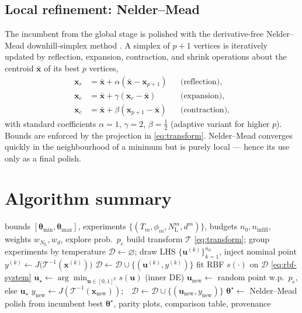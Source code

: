 \documentclass[11pt]{article}
\newcommand{\param}{\bm{\theta}}
\newcommand{\xv}{\bm{x}}
\newcommand{\NL}{N_{\mathrm{L}}}
\newcommand{\dpa}{\phi}
\begin{document}
\subsection{Local refinement: Nelder--Mead}
The incumbent from the global stage is polished with the derivative-free
Nelder--Mead downhill-simplex method \citep{NelderMead1965}. A simplex of $p+1$
vertices is iteratively updated by reflection, expansion, contraction, and shrink
operations about the centroid $\bar{\xv}$ of its best $p$ vertices,
\begin{align}
  \xv_{r} &= \bar{\xv}+\alpha(\bar{\xv}-\xv_{p+1}) &&\text{(reflection)},\\
  \xv_{e} &= \bar{\xv}+\gamma(\xv_{r}-\bar{\xv})   &&\text{(expansion)},\\
  \xv_{c} &= \bar{\xv}+\beta(\xv_{p+1}-\bar{\xv})  &&\text{(contraction)},
\end{align}
with standard coefficients $\alpha=1$, $\gamma=2$, $\beta=\tfrac12$ (adaptive
variant for higher $p$). Bounds are enforced by the projection in
\eqref{eq:transform}. Nelder--Mead converges quickly in the neighbourhood of a
minimum but is purely local --- hence its use only as a final polish.

\section{Algorithm summary}
\begin{algorithm}[ht]
\caption{Surrogate-based parameter identification (default path)}
\label{alg:sbo}
\begin{algorithmic}[1]
\Require bounds $[\param_{\min},\param_{\max}]$, experiments $\{(T_m,\dpa_m,\NL^m,d^m)\}$,
         budgets $n_0,n_{\mathrm{infill}}$, weights $w_{\NL},w_d$, explore prob.\ $p_e$
\State build transform $\mathcal{T}$ \eqref{eq:transform}; group experiments by temperature
\State $\mathcal{D}\gets\varnothing$; draw LHS $\{\bm u^{(k)}\}_{k=1}^{n_0}$, inject nominal point
   \State $y^{(k)}\gets J\big(\mathcal{T}^{-1}(\xv^{(k)})\big)$ 
   \State $\mathcal{D}\gets\mathcal{D}\cup\{(\bm u^{(k)},y^{(k)})\}$
\EndFor
{}
   \State fit RBF $s(\cdot)$ on $\mathcal{D}$ \eqref{eq:rbf-system}
   \State $\bm u_{\star}\gets\arg\min_{\bm u\in[0,1]^p} s(\bm u)$ (inner DE)
   \State $\bm u_{\mathrm{new}}\gets$ random point w.p.\ $p_e$, else $\bm u_{\star}$
   \State $y_{\mathrm{new}}\gets J(\mathcal{T}^{-1}(\xv_{\mathrm{new}}))$;\ \ $\mathcal{D}\gets\mathcal{D}\cup\{(\bm u_{\mathrm{new}},y_{\mathrm{new}})\}$
\EndFor
\State $\param^{\star}\gets$ Nelder--Mead polish from incumbent best \citep{NelderMead1965}
\State \Return $\param^{\star}$, parity plots, comparison table, provenance
\end{algorithmic}
\end{algorithm}
\end{document}
